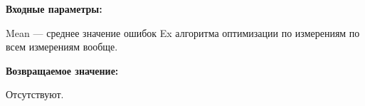 \textbf{Входные параметры:}

Mean --- среднее значение ошибок Ex алгоритма оптимизации по измерениям по всем измерениям вообще.

\textbf{Возвращаемое значение:}

Отсутствуют.
